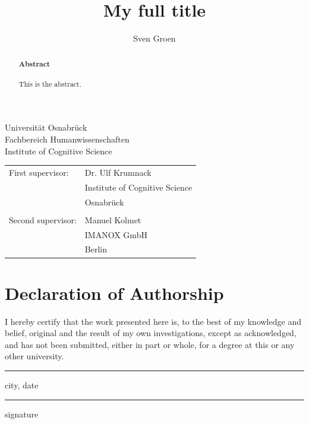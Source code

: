 \documentclass[11pt,
  paper=a4, 
  bibliography=totocnumbered,
	captions=tableheading,
	BCOR=10mm
]{scrreprt}
\title{My full title}
\author{Sven Groen}
\theoremstyle{definition}
\newcommand{\namesigdate}[1][5cm]{%
	\vspace{5cm}
	{\setlength{\parindent}{0cm}
	\begin{minipage}{0.3\textwidth}
		\hrule 
		\vspace{0.5cm}
		{\small city, date}
	\end{minipage}
	 \hfill
	\begin{minipage}{0.3\textwidth}
		\hrule
		\vspace{0.5cm}
	    {\small signature}
	\end{minipage}
	}
}
\begin{document}
\begin{titlepage}
	\begin{flushleft}
		Universität Osnabrück\\
		Fachbereich Humanwissenschaften\\
		Institute of Cognitive Science
	\end{flushleft}

	\vspace{2cm}
	\vspace{1cm}

	\begin{tabular}{ll}
		First supervisor:  & Dr. Ulf Krumnack          \\
		                   & Institute of Cognitive Science            \\
		                   & Osnabrück                \\\\
		Second supervisor: & Manuel Kolmet         \\
		                   & IMANOX GmbH  \\
		                   & Berlin 
	\end{tabular}

\end{titlepage}


\chapter*{Declaration of Authorship}
I hereby certify that the work presented here is, to the best of my knowledge and belief, original and the result of my own investigations, except as acknowledged, and has not been submitted, either in part or whole, for a degree at this or any other university.

\namesigdate
{}
\pagebreak

\begin{abstract}
	\textbf{\LARGE{Abstract}}\\\\
	This is the abstract.
\end{abstract}
\end{document}
